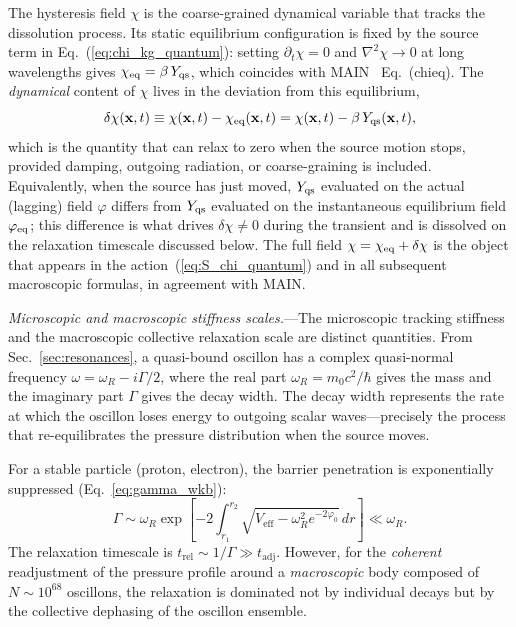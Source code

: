 \documentclass[aps,prd,onecolumn,superscriptaddress,nofootinbib,showpacs,12pt,notitlepage]{revtex4-2}
\begin{document}
The hysteresis field $\chi$ is the coarse-grained
dynamical variable that tracks the dissolution process.
Its static equilibrium configuration is fixed by the
source term in Eq.~(\ref{eq:chi_kg_quantum}): setting
$\partial_t\chi = 0$ and $\nabla^2\chi \to 0$ at
long wavelengths gives $\chi_{\rm eq} = \beta\,Y_{\rm qs}$, which
coincides with MAIN~\cite{Lotishvili2026}
Eq.~(chieq).  The \emph{dynamical} content of $\chi$
lives in the deviation from this equilibrium,
\begin{equation}\label{eq:chi_interpretation}
  \delta\chi(\mathbf{x}, t)
  \equiv \chi(\mathbf{x}, t) - \chi_{\rm eq}(\mathbf{x}, t)
  = \chi(\mathbf{x}, t) - \beta\,Y_{\rm qs}(\mathbf{x}, t),
\end{equation}
which is the quantity that can relax to zero when the
source motion stops, provided damping, outgoing radiation, or
coarse-graining is included.  Equivalently, when the source has
just moved, $Y_{\rm qs}$ evaluated on the actual (lagging) field
$\varphi$ differs from $Y_{\rm qs}$ evaluated on the instantaneous
equilibrium field $\varphi_{\rm eq}$; this difference is
what drives $\delta\chi \neq 0$ during the transient and
is dissolved on the relaxation timescale discussed below.
The full field $\chi = \chi_{\rm eq} + \delta\chi$ is the
object that appears in the action~(\ref{eq:S_chi_quantum})
and in all subsequent macroscopic formulas, in agreement
with MAIN.

\textit{Microscopic and macroscopic stiffness scales.}---The
microscopic tracking stiffness and the macroscopic collective
relaxation scale are distinct quantities.  From
Sec.~\ref{sec:resonances}, a quasi-bound oscillon has
a complex quasi-normal frequency
$\omega = \omega_R - i\Gamma/2$, where the real part
$\omega_R = m_0 c^2/\hbar$ gives the mass and the
imaginary part $\Gamma$ gives the decay width.  The
decay width represents the rate at which the oscillon
loses energy to outgoing scalar waves---precisely the
process that re-equilibrates the pressure distribution
when the source moves.

For a stable particle (proton, electron), the barrier
penetration is exponentially suppressed (Eq.~\ref{eq:gamma_wkb}):
\begin{equation}\label{eq:gamma_stable}
  \Gamma \sim \omega_R \exp\!\left[-2\int_{r_1}^{r_2}
    \sqrt{V_{\mathrm{eff}} - \omega_R^2 e^{-2\varphi_0}}\,dr\right]
  \ll \omega_R.
\end{equation}
The relaxation timescale is $t_{\mathrm{rel}} \sim
1/\Gamma \gg t_{\mathrm{adj}}$.  However, for the
\emph{coherent} readjustment of the pressure profile
around a \emph{macroscopic} body composed of $N \sim 10^{68}$
oscillons, the relaxation is dominated not by individual
decays but by the collective dephasing of the oscillon
ensemble.
\end{document}
